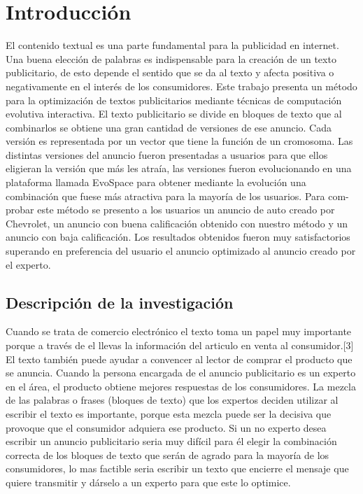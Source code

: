 
\chapter{Introducci\'on}

El contenido textual es una parte fundamental para la publicidad en internet. Una buena elección de palabras es indispensable para la creación de un texto publicitario, de esto depende el sentido que se da al texto y afecta positiva o negativamente en el interés de los consumidores. Este trabajo presenta un método para la optimización de textos publicitarios mediante técnicas de computación evolutiva interactiva. El texto publicitario se divide en bloques de texto que al combinarlos se obtiene una gran cantidad de versiones de ese anuncio. Cada versión es representada por un vector que tiene la función de un cromosoma. Las distintas versiones del anuncio fueron presentadas a usuarios para que ellos eligieran la versión que más les atraía, las versiones fueron evolucionando en una plataforma llamada EvoSpace para obtener mediante la evolución una combinación que fuese más atractiva para la mayoría de los usuarios. Para com-probar este método se presento a los usuarios un anuncio de auto creado por Chevrolet, un anuncio con buena calificación obtenido con nuestro método y un anuncio con baja calificación. Los resultados obtenidos fueron muy satisfactorios superando en preferencia del usuario el anuncio optimizado al anuncio creado por el experto.

\section{Descripción de la investigación}

Cuando se trata de comercio electrónico el texto toma un papel muy importante porque a través de el llevas la información del articulo en venta al consumidor.[3] El texto también puede ayudar a convencer al lector de comprar el producto que se anuncia. Cuando la persona encargada de el anuncio publicitario es un experto en el área, el producto obtiene mejores respuestas de los consumidores. La mezcla de las palabras o frases (bloques de texto) que los expertos deciden utilizar al escribir el texto es importante, porque esta mezcla puede ser la decisiva que provoque que el consumidor adquiera ese producto. Si un no experto desea escribir un anuncio publicitario seria muy difícil para él elegir la combinación correcta de los bloques de texto que serán de agrado para la mayoría de los consumidores, lo mas factible seria escribir un texto que encierre el mensaje que quiere transmitir y dárselo a un experto para que este lo optimice. 


